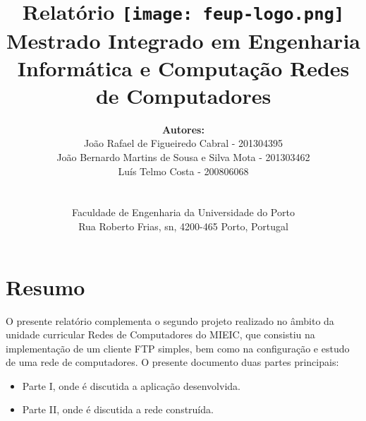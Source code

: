 \documentclass{article}
\begin{document}
\setlength{\textwidth}{16cm}
\setlength{\textheight}{22cm}

\title{
\Large\textbf{Relatório}\linebreak\linebreak
\linebreak\linebreak
\texttt{[image: feup-logo.png]}\linebreak\linebreak
\linebreak\linebreak
\Large{Mestrado Integrado em Engenharia Informática e Computação} \linebreak\linebreak
\Large{Redes de Computadores}\linebreak
}

\author{\textbf{Autores:}\\
João Rafael de Figueiredo Cabral - 201304395 \\
João Bernardo Martins de Sousa e Silva Mota - 201303462 \\
Luís Telmo Costa - 200806068\\
\linebreak\linebreak \\
 \\ Faculdade de Engenharia da Universidade do Porto \\ Rua Roberto Frias, s\/n, 4200-465 Porto, Portugal \linebreak\linebreak\linebreak
\linebreak\linebreak\vspace{1cm}}

\maketitle
\thispagestyle{empty}


\maketitle
\newpage
\tableofcontents

\section{Resumo}
O presente relatório complementa o segundo projeto realizado no âmbito da unidade curricular Redes de Computadores do MIEIC, que consistiu na implementação de um cliente FTP simples, bem como na configuração e estudo de uma rede de computadores.
O presente documento duas partes principais:
\begin{itemize}
\item Parte I, onde é discutida a aplicação desenvolvida.
\item Parte II, onde é discutida a rede construída.
\end{itemize}
\end{document}
